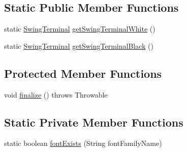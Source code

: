\subsection*{Static Public Member Functions}
\begin{DoxyCompactItemize}
\item 
static \hyperlink{classgov_1_1nasa_1_1jpf_1_1inspector_1_1frontends_1_1jpfshell_1_1gui_1_1_swing_terminal}{Swing\+Terminal} \hyperlink{classgov_1_1nasa_1_1jpf_1_1inspector_1_1frontends_1_1jpfshell_1_1gui_1_1_swing_terminal_a1d87049f9eb05c3d63bc35ce231d2aa5}{get\+Swing\+Terminal\+White} ()
\item 
static \hyperlink{classgov_1_1nasa_1_1jpf_1_1inspector_1_1frontends_1_1jpfshell_1_1gui_1_1_swing_terminal}{Swing\+Terminal} \hyperlink{classgov_1_1nasa_1_1jpf_1_1inspector_1_1frontends_1_1jpfshell_1_1gui_1_1_swing_terminal_a688e47477deb7e9da87b4d69071246bd}{get\+Swing\+Terminal\+Black} ()
\end{DoxyCompactItemize}
\subsection*{Protected Member Functions}
\begin{DoxyCompactItemize}
\item 
void \hyperlink{classgov_1_1nasa_1_1jpf_1_1inspector_1_1frontends_1_1jpfshell_1_1gui_1_1_swing_terminal_a4886747d856c251993af7336a3d49c4d}{finalize} ()  throws Throwable 
\end{DoxyCompactItemize}
\subsection*{Static Private Member Functions}
\begin{DoxyCompactItemize}
\item 
static boolean \hyperlink{classgov_1_1nasa_1_1jpf_1_1inspector_1_1frontends_1_1jpfshell_1_1gui_1_1_swing_terminal_a532a2b885da281bee596ea0d6ac47607}{font\+Exists} (String font\+Family\+Name)
\end{DoxyCompactItemize}
